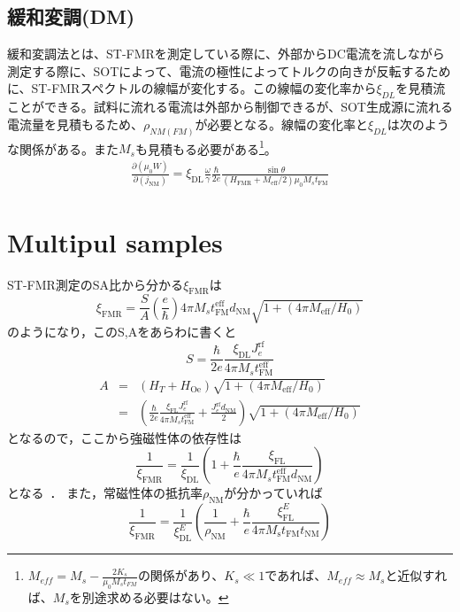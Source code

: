 \documentclass[12pt]{jsbook}
\begin{document}
\subsection{緩和変調(DM)}
緩和変調法とは、ST-FMRを測定している際に、外部からDC電流を流しながら測定する際に、SOTによって、電流の極性によってトルクの向きが反転するために、ST-FMRスペクトルの線幅が変化する。この線幅の変化率から$\xi_{DL}$を見積流ことができる。試料に流れる電流は外部から制御できるが、SOT生成源に流れる電流量を見積もるため、$\rho_{NM(FM)}$が必要となる。線幅の変化率と$\xi_{DL}$は次のような関係がある。また$M_s$も見積もる必要がある\footnote{ $\displaystyle M_{eff}=M_s-\frac{2K_s}{\mu_0M_st_{FM}}$の関係があり、$K_s\ll 1$であれば、$M_{eff}\approx M_s$と近似すれば、$M_s$を別途求める必要はない。}。
\begin{align}
	\frac{\partial\left(\mu_{0}  W\right)}{\partial\left(j_{\mathrm{NM}}\right)}=\xi_{\mathrm{DL}} \frac{\omega}{\gamma} \frac{\hbar}{2 e} \frac{\sin \theta}{\left(H_{\mathrm{FMR}}+M_{\mathrm{eff}} / 2\right) \mu_{0} M_{s} t_{\mathrm{FM}}}
\end{align}


\section{Multipul samples}

ST-FMR測定のSA比から分かる$\xi_\mathrm{FMR}$は
\begin{equation}
\xi_{\mathrm{FMR}}=\frac{S}{A}\left(\frac{e}{\hbar}\right) 4 \pi M_{s} t_{\mathrm{FM}}^{\mathrm{eff}} d_{\mathrm{NM}} \sqrt{1+\left(4 \pi M_{\mathrm{eff}} / H_{0}\right)}
\end{equation}
のようになり，このS,Aをあらわに書くと
\begin{equation}
S=\frac{\hbar}{2 e} \frac{\xi_{\mathrm{DL}} J_{e}^{\mathrm{rf}}}{4 \pi M_{s} t_{\mathrm{FM}}^{\mathrm{eff}}}
\end{equation}
\begin{eqnarray}
A &=&\nonumber \left(H_{T}+H_{\mathrm{Oe}}\right) \sqrt{1+\left(4 \pi M_{\mathrm{eff}} / H_{0}\right)} \\
&=&\left(\frac{\hbar}{2 e} \frac{\xi_{\mathrm{FL}} J_{e}^{\mathrm{rf}}}{4 \pi M_{s} t_{\mathrm{FM}}^{\mathrm{eff}}}+\frac{J_{e}^{\mathrm{rf}} d_{\mathrm{NM}}}{2}\right) \sqrt{1+\left(4 \pi M_{\mathrm{eff}} / H_{0}\right)}
\end{eqnarray}
となるので，ここから強磁性体の依存性は
\begin{equation}
\frac{1}{\xi_{\mathrm{FMR}}}=\frac{1}{\xi_{\mathrm{DL}}}\left(1+\frac{\hbar}{e} \frac{\xi_{\mathrm{FL}}}{4 \pi M_{s} t_{\mathrm{FM}}^{\mathrm{eff}} d_{\mathrm{NM}}}\right)
\end{equation}
となる~\cite{PhysRevB.92.064426}．
また，常磁性体の抵抗率$\rho_\mathrm{NM}$が分かっていれば
\begin{equation}
\frac{1}{\xi_{\mathrm{FMR}}}=\frac{1}{\xi_{\mathrm{DL}}^{E}}\left(\frac{1}{\rho_{\mathrm{NM}}}+\frac{\hbar}{e} \frac{\xi_{\mathrm{FL}}^{E}}{4 \pi M_{\mathrm{s}} t_{\mathrm{FM}} t_{\mathrm{NM}}}\right)
\end{equation}
\end{document}
